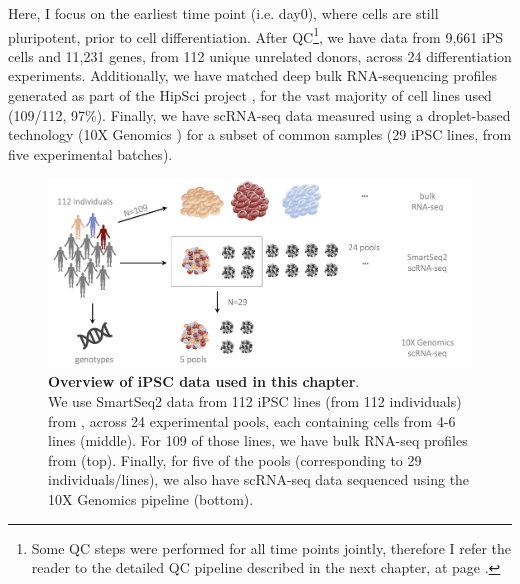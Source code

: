 Here,
I focus on the earliest time point (i.e. day0), where cells are still pluripotent, prior to cell differentiation.
After QC\footnote{Some QC steps were performed for all time points jointly, therefore I refer the reader to the detailed QC pipeline described in the next chapter, at page \pageref{fig:endodiff_qc_workflow}.}, we have data from 9,661 iPS cells and 11,231 genes, from 112 unique unrelated donors, across 24 differentiation experiments. 
Additionally, we have matched deep bulk RNA-sequencing profiles generated as part of the HipSci project \cite{kilpinen2017common}, for the vast majority of cell lines used (109/112, 97\%).
Finally, we have scRNA-seq data measured using a droplet-based technology (10X Genomics \cite{zheng2017massively}) for a subset of common samples (29 iPSC lines, from five experimental batches). 

\begin{figure}[h]
\centering
\includegraphics[width=14.5cm]{Chapter3/Fig/ips_data.png}
\caption[iPSC data]{\textbf{Overview of iPSC data used in this chapter}.\\
We use SmartSeq2 \cite{purcell2007plink} data from 112 iPSC lines (from 112 individuals) from \cite{cuomo2020single}, across 24 experimental pools, each containing cells from 4-6 lines (middle).
For 109 of those lines, we have bulk RNA-seq profiles from \cite{mirauta2018population}(top).
Finally, for five of the pools (corresponding to 29 individuals/lines), we also have scRNA-seq data sequenced using the 10X Genomics pipeline \cite{zheng2017massively}(bottom).}
\label{fig:ipsc_data}
\end{figure}

